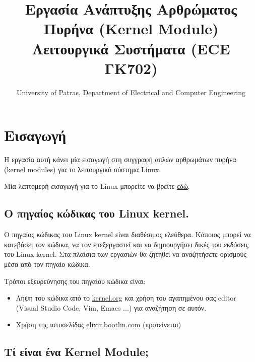 \documentclass[18pt]{extarticle}
\title{Εργασία Ανάπτυξης Αρθρώματος Πυρήνα (Kernel Module) \\Λειτουργικά Συστήματα (ECE ΓΚ702)} %
\date{University of Patras, Department of Electrical and Computer Engineering} %
\begin{document}
\pagestyle{fancy}
\fancyhf{} %
\renewcommand{\headrulewidth}{0pt}
\fancyhead{} %
\fancyfoot{} %
\fancyfoot[R]{\thepage}

\maketitle


\section{Εισαγωγή}

Η εργασία αυτή κάνει μία εισαγωγή στη συγγραφή απλών αρθρωμάτων πυρήνα (kernel modules) 
για το λειτουργικό σύστημα Linux.

Μία λεπτομερή εισαγωγή για το Linux μπορείτε να βρείτε \href{https://linux-kernel-labs.github.io/refs/heads/master/lectures/intro.html}{εδώ}.

\subsection{Ο πηγαίος κώδικας του Linux kernel.}

Ο πηγαίος κώδικας του Linux kernel είναι διαθέσιμος ελεύθερα. 
Κάποιος μπορεί να κατεβάσει τον κώδικα, να τον επεξεργαστεί και να δημιουργήσει δικές του εκδόσεις του Linux kernel.
Στα πλαίσια των εργασιών θα ζητηθεί να αναζητήσετε ορισμούς μέσα από τον πηγαίο κώδικα.

Τρόποι εξευρεύνησης του πηγαίου κώδικα είναι:

\begin{itemize}
    \item Λήψη του κώδικα από το \href{https://kernel.org/}{kernel.org} και χρήση του αγαπημένου σας editor (Visual Studio Code, Vim, Emacs ...) για αναζήτηση σε αυτόν.
    \item Χρήση της ιστοσελίδας \href{https://elixir.bootlin.com/linux/latest/source}{elixir.bootlin.com} (προτείνεται)
\end{itemize}

\subsection{Τί είναι ένα Kernel Module;}
\end{document}
